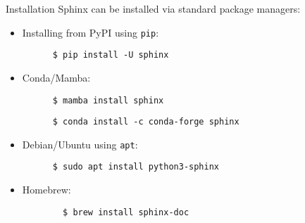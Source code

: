 \begin{frame}[fragile]{Installation}
  Sphinx can be installed via standard package managers:
  \begin{itemize}
    \item Installing from PyPI using \texttt{pip}:
    \begin{verbatim}
      $ pip install -U sphinx
    \end{verbatim}
    \item Conda/Mamba:
    \begin{verbatim}
      $ mamba install sphinx
    \end{verbatim}
    \begin{verbatim}
      $ conda install -c conda-forge sphinx
    \end{verbatim}

    \item Debian/Ubuntu using \texttt{apt}:
    \begin{verbatim}
      $ sudo apt install python3-sphinx
    \end{verbatim}

    \item Homebrew:
      \begin{verbatim}
        $ brew install sphinx-doc
      \end{verbatim}
  \end{itemize}
\end{frame}

